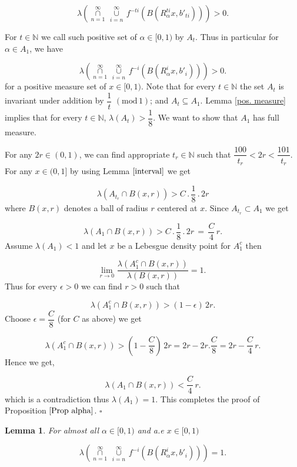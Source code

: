 \documentclass[11pt, english, reqno]{amsart}
\newtheorem{lemma}[theorem]{Lemma}
\theoremstyle{definition}
\theoremstyle{remark}
\numberwithin{equation}{section}
\numberwithin{equation}{section}
\newcommand{\Leb}{\ensuremath{\lambda}}
\newcommand{\LS}{\ensuremath{\underset{n=1}{\overset{\infty}{\cap}} \, {\underset{i=n}{\overset{\infty}{\cup}}}\,}}
\begin{document}
\begin{equation}
    \Leb(\LS f^{-ti}(B (R_{\alpha}^{ti} x,b'_{ti})))> 0 . 
\end{equation}

For $t \in \mathbb{N}$ we call such positive set of $\alpha \in [0,1)$ by $A_t$. Thus in particular for $\alpha \in A_1$, we have 

\begin{equation}\label{eq 14}
    \Leb(\LS f^{-i}(B (R_{\alpha}^{i} x,b'_{i})))> 0 . 
\end{equation} for a positive measure set of $x \in [0,1)$. Note that for every $t \in \mathbb{N}$ the set $A_t$ is invariant under addition by $\dfrac{1}{t} \,\, (\mathrm{mod} \,1)$; and $A_{t} \subseteq A_1$. Lemma \ref{pos. measure} implies that for every $t \in \mathbb{N}$, $\lambda(A_t) > \dfrac{1}{8}$. We want to show that $A_1$ has full measure.

For any $2r \in (0,1)$, we can find appropriate $t_r \in \mathbb{N}$ such that $\dfrac{100}{t_r} < 2r < \dfrac{101}{t_r}$. For any $x \in (0,1]$ by using Lemma $\ref{interval}$  we get

$$
\lambda(A_{t_r} \cap B(x, r)) > C \,.\, \dfrac{1}{8}\,.\, 2r
$$ where $B(x, r)$ denotes a ball of radius $r$ centered at $x$. Since $A_{t_r} \subset A_1$ we get

\begin{equation}\label{A_1}
    \lambda (A_1 \cap B(x, r)) > C \,.\, \dfrac{1}{8}\,.\, 2r \,=\, \dfrac{C}{4} \, r.
\end{equation} Assume $\lambda(A_1) < 1$ and let $x$ be a Lebesgue density point for $A_1^c$ then

$$\underset{r \rightarrow 0}{\mathrm{lim}} \,\, \dfrac{\lambda(A_1^c \cap B(x, r))}{\lambda(B(x, r))} = 1.$$ Thus for every $\epsilon > 0$ we can find $r > 0$ such that

$$
\lambda(A_1^c \cap B(x, r)) > (1-\epsilon)\, 2r.
$$ Choose $\epsilon = \dfrac{C}{8}$ (for $C$ as above) we get 

$$
\lambda(A_1^c \cap B(x, r)) > (1-\dfrac{C}{8})\, 2r = 2r - 2r . \dfrac{C}{8} = 2r - \dfrac{C}{4}\, r.
$$ Hence we get,

$$
\lambda(A_1 \cap B(x, r)) <  \dfrac{C}{4}\, r.
$$ which is a contradiction thus $\lambda(A_1) = 1$. This completes the proof of Proposition $\ref{Prop alpha}$.  \hfill{$\square$} 

\begin{lemma}\label{lem x&y}
For almost all $\alpha \in [0,1)$ and a.e $x \in [0,1)$

\begin{equation*}
    \Leb(\LS f^{-i}(B (R_{\alpha}^{i} x,b'_i)))= 1 . 
\end{equation*}

\end{lemma}
\end{document}
